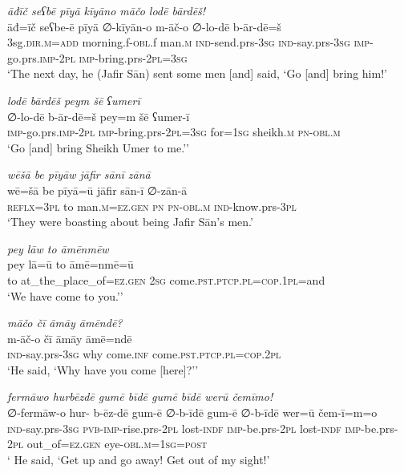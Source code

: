 \ea \label{ŠJ.20}
\textit{āđīč seʕbē pīyā kīyāno māčo lodē bārdēš!} \\ 
\gll āđ=īč seʕbe-ē pīyā ∅-kīyān-o m-āč-o ∅-lo-dē b-ār-dē=š \\ 
 3sg\textsc{.dir}\textsc{.m}\textsc{=add} morning.f\textsc{-obl}.f man\textsc{.m} \textsc{ind-}send.prs\textsc{-3sg} \textsc{ind-}say.prs\textsc{-3sg} \textsc{imp-}go.prs.\textsc{imp-}\textsc{2pl} \textsc{imp-}bring.prs-\textsc{2pl}\textsc{=3sg} \\ 
\glt `The next day, he (Jafir Sān) sent some men [and] said, ‘Go [and] bring him!'
\z 
 
\ea \label{ŠJ.21}
\textit{lodē bārdēš peym šē ʕumerī} \\ 
\gll ∅-lo-dē b-ār-dē=š pey=m šē ʕumer-ī \\ 
 \textsc{imp-}go.prs.\textsc{imp-}\textsc{2pl} \textsc{imp-}bring.prs-\textsc{2pl}\textsc{=3sg} for\textsc{=\textsc{1sg}} sheikh\textsc{.m} \textsc{pn}\textsc{-obl}\textsc{.m} \\ 
\glt `Go [and] bring Sheikh Umer to me.’'
\z 
 
\ea \label{ŠJ.29}
\textit{wēšā be pīyāw jāfir sānī zānā} \\ 
\gll wē=šā be pīyā=ū jāfir sān-ī ∅-zān-ā \\ 
 \textsc{reflx}\textsc{=3pl} to man\textsc{.m}\textsc{=ez.gen} \textsc{pn} \textsc{pn}\textsc{-obl}\textsc{.m} \textsc{ind-}know.prs\textsc{-3pl} \\ 
\glt `They were boasting about being Jafir Sān’s men.'
\z 
 
\ea \label{ŠJ.32}
\textit{pey lāw to āmēnmēw} \\ 
\gll pey lā=ū to āmē=nmē=ū \\ 
 to at\_the\_place\_of\textsc{=ez.gen} \textsc{2sg} come\textsc{.pst}\textsc{.ptcp}\textsc{.pl}\textsc{=cop}\textsc{.\textsc{1pl}}=and \\ 
\glt `We have come to you.’'
\z 
 
\ea \label{ŠJ.35}
\textit{māčo čī āmāy āmēndē?} \\ 
\gll m-āč-o čī āmāy āmē=ndē \\ 
 \textsc{ind-}say.prs\textsc{-3sg} why come\textsc{.inf} come\textsc{.pst}\textsc{.ptcp}\textsc{.pl}\textsc{=cop}.\textsc{2pl} \\ 
\glt `He said, ‘Why have you come [here]?’'
\z 
 
\ea \label{ŠJ.37}
\textit{fermāwo hurbēzdē gumē bīdē gumē bīdē werū čemīmo!} \\ 
\gll ∅-fermāw-o hur- b-ēz-dē gum-ē ∅-b-īdē gum-ē ∅-b-īdē wer=ū čem-ī=m=o \\ 
 \textsc{ind-}say.prs\textsc{-3sg} \textsc{pvb-}\textsc{imp-}rise.prs-\textsc{2pl} lost\textsc{-indf} \textsc{imp-}be.prs-\textsc{2pl} lost\textsc{-indf} \textsc{imp-}be.prs-\textsc{2pl} out\_of\textsc{=ez.gen} eye\textsc{-obl}\textsc{.m}\textsc{=\textsc{1sg}}\textsc{=\textsc{post}} \\ 
\glt ` He said, ‘Get up and go away! Get out of my sight!'
\z 
 

